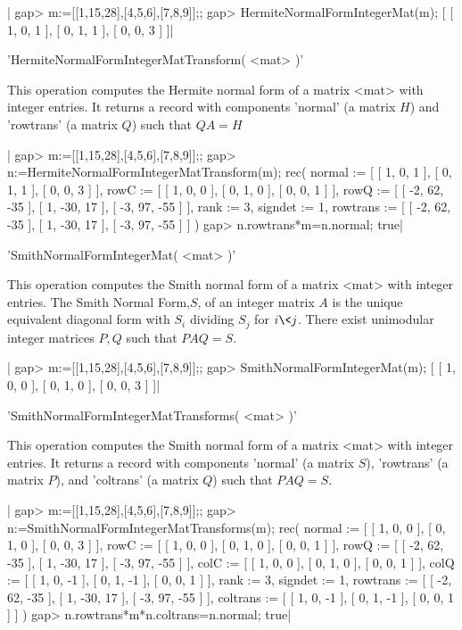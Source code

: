 |    gap> m:=[[1,15,28],[4,5,6],[7,8,9]];;
    gap> HermiteNormalFormIntegerMat(m);
    [ [ 1, 0, 1 ], [ 0, 1, 1 ], [ 0, 0, 3 ] ]|

'HermiteNormalFormIntegerMatTransform( <mat> )'

This operation computes the Hermite normal form of a matrix <mat> with
integer entries. It returns a record with components 'normal' (a matrix
$H$) and 'rowtrans' (a matrix $Q$) such that $QA=H$

|    gap> m:=[[1,15,28],[4,5,6],[7,8,9]];;
    gap> n:=HermiteNormalFormIntegerMatTransform(m);
    rec( normal := [ [ 1, 0, 1 ], [ 0, 1, 1 ], [ 0, 0, 3 ] ],
      rowC := [ [ 1, 0, 0 ], [ 0, 1, 0 ], [ 0, 0, 1 ] ],
      rowQ := [ [ -2, 62, -35 ], [ 1, -30, 17 ], [ -3, 97, -55 ] ], rank := 3,
      signdet := 1,
      rowtrans := [ [ -2, 62, -35 ], [ 1, -30, 17 ], [ -3, 97, -55 ] ] )
    gap> n.rowtrans*m=n.normal;
    true|

'SmithNormalFormIntegerMat( <mat> )'

This  operation  computes  the  Smith  normal  form  of a matrix <mat> with
integer entries. The Smith Normal Form,$S$, of an integer matrix $A$ is the
unique  equivalent diagonal  form with  $S_i$ dividing  $S_j$ for $i \< j$.
There exist unimodular integer matrices $P, Q$ such that $PAQ = S.$

|    gap> m:=[[1,15,28],[4,5,6],[7,8,9]];;
    gap> SmithNormalFormIntegerMat(m);
    [ [ 1, 0, 0 ], [ 0, 1, 0 ], [ 0, 0, 3 ] ]|

'SmithNormalFormIntegerMatTransforms( <mat> )'

This  operation  computes  the  Smith  normal  form  of a matrix <mat> with
integer  entries. It  returns a  record with  components 'normal' (a matrix
$S$),  'rowtrans' (a matrix  $P$), and 'coltrans'  (a matrix $Q$) such that
$PAQ=S$.

|    gap> m:=[[1,15,28],[4,5,6],[7,8,9]];;
    gap> n:=SmithNormalFormIntegerMatTransforms(m);
    rec( normal := [ [ 1, 0, 0 ], [ 0, 1, 0 ], [ 0, 0, 3 ] ],
      rowC := [ [ 1, 0, 0 ], [ 0, 1, 0 ], [ 0, 0, 1 ] ],
      rowQ := [ [ -2, 62, -35 ], [ 1, -30, 17 ], [ -3, 97, -55 ] ],
      colC := [ [ 1, 0, 0 ], [ 0, 1, 0 ], [ 0, 0, 1 ] ],
      colQ := [ [ 1, 0, -1 ], [ 0, 1, -1 ], [ 0, 0, 1 ] ], rank := 3,
      signdet := 1,
      rowtrans := [ [ -2, 62, -35 ], [ 1, -30, 17 ], [ -3, 97, -55 ] ],
      coltrans := [ [ 1, 0, -1 ], [ 0, 1, -1 ], [ 0, 0, 1 ] ] )
    gap> n.rowtrans*m*n.coltrans=n.normal;
    true|

